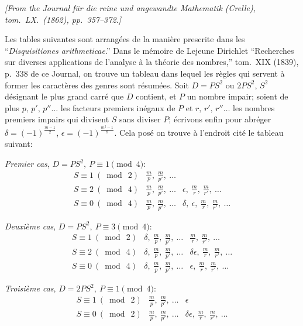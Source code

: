 \documentclass[11pt,a4paper]{article}
\theoremstyle{plain}
\begin{document}
\noindent\textit{[From the Journal f\"ur die reine und angewandte Mathematik (Crelle), tom.\ LX.\ (1862), pp.\ 357--372.]}

\medskip

Les tables suivantes sont arrang\'ees de la mani\`ere prescrite dans les ``\textit{Disquisitiones arithmeticae}.'' Dans le m\'emoire de Lejeune Dirichlet ``Recherches sur diverses applications de l'analyse \`a la th\'eorie des nombres,'' tom.\ XIX (1839), p.~338 de ce Journal, on trouve un tableau dans lequel les r\`egles qui servent \`a former les caract\`eres des genres sont r\'esum\'ees. Soit $D = PS^2$ ou $2PS^2$, $S^2$ d\'esignant le plus grand carr\'e que $D$ contient, et $P$ un nombre impair; soient de plus $p,\,p',\,p''\ldots$ les facteurs premiers in\'egaux de $P$ et $r,\,r',\,r''\ldots$ les nombres premiers impairs qui divisent $S$ sans diviser $P$; \'ecrivons enfin pour abr\'eger $\delta = (-1)^{\frac{m-1}{2}}$, $\epsilon = (-1)^{\frac{m^2-1}{8}}$. Cela pos\'e on trouve \`a l'endroit cit\'e le tableau suivant:

\medskip

\noindent\textit{Premier cas}, $D = PS^2,\ P \equiv 1 \pmod{4}$:
\[
\begin{array}{l|l|l}
S \equiv 1\ (\bmod\ 2) & \tfrac{m}{p},\ \tfrac{m}{p'},\ \ldots & \\
S \equiv 2\ (\bmod\ 4) & \tfrac{m}{p},\ \tfrac{m}{p'},\ \ldots & \epsilon,\ \tfrac{m}{r},\ \tfrac{m}{r'},\ \ldots\\
S \equiv 0\ (\bmod\ 4) & \tfrac{m}{p},\ \tfrac{m}{p'},\ \ldots & \delta,\ \epsilon,\ \tfrac{m}{r},\ \tfrac{m}{r'},\ \ldots
\end{array}
\]

\noindent\textit{Deuxi\`eme cas}, $D = PS^2,\ P \equiv 3 \pmod{4}$:
\[
\begin{array}{l|l|l}
S \equiv 1\ (\bmod\ 2) & \delta,\ \tfrac{m}{p},\ \tfrac{m}{p'},\ \ldots & \tfrac{m}{r},\ \tfrac{m}{r'},\ \ldots\\
S \equiv 2\ (\bmod\ 4) & \delta,\ \tfrac{m}{p},\ \tfrac{m}{p'},\ \ldots & \delta\epsilon,\ \tfrac{m}{r},\ \tfrac{m}{r'},\ \ldots\\
S \equiv 0\ (\bmod\ 4) & \delta,\ \tfrac{m}{p},\ \tfrac{m}{p'},\ \ldots & \epsilon,\ \tfrac{m}{r},\ \tfrac{m}{r'},\ \ldots
\end{array}
\]

\noindent\textit{Troisi\`eme cas}, $D = 2PS^2,\ P \equiv 1 \pmod{4}$:
\[
\begin{array}{l|l|l}
S \equiv 1\ (\bmod\ 2) & \tfrac{m}{p},\ \tfrac{m}{p'},\ \ldots & \epsilon\\
S \equiv 0\ (\bmod\ 2) & \tfrac{m}{p},\ \tfrac{m}{p'},\ \ldots & \delta\epsilon,\ \tfrac{m}{r},\ \tfrac{m}{r'},\ \ldots
\end{array}
\]
\end{document}

